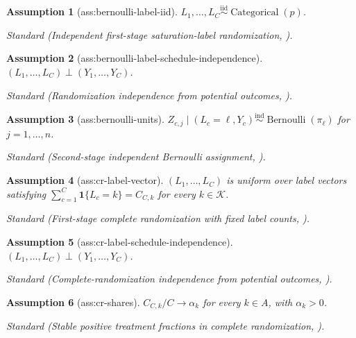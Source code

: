 \documentclass{article}
\newtheorem{assumption}{Assumption}
\begin{document}
\begin{assumption}[ass:bernoulli-label-iid]\label{ass:bernoulli-label-iid}
\(L_1,\ldots,L_C\stackrel{\mathrm{iid}}{\sim}\operatorname{Categorical}(p)\).
\par\smallskip\noindent\emph{Standard} (Independent first-stage saturation-label randomization, \cite{HanOwusuShin2026}).
\end{assumption}

\begin{assumption}[ass:bernoulli-label-schedule-independence]\label{ass:bernoulli-label-schedule-independence}
\((L_1,\ldots,L_C)\perp(Y_1,\ldots,Y_C)\).
\par\smallskip\noindent\emph{Standard} (Randomization independence from potential outcomes, \cite{HanOwusuShin2026}).
\end{assumption}

\begin{assumption}[ass:bernoulli-units]\label{ass:bernoulli-units}
\(Z_{c,j}\mid(L_c=\ell,Y_c)\stackrel{\mathrm{ind}}{\sim}\operatorname{Bernoulli}(\pi_\ell)\) for \(j=1,\ldots,n\).
\par\smallskip\noindent\emph{Standard} (Second-stage independent Bernoulli assignment, \cite{HanOwusuShin2026}).
\end{assumption}

\begin{assumption}[ass:cr-label-vector]\label{ass:cr-label-vector}
\((L_1,\ldots,L_C)\) is uniform over label vectors satisfying \(\sum_{c=1}^C\mathbf 1\{L_c=k\}=C_{C,k}\) for every \(k\in\mathcal K\).
\par\smallskip\noindent\emph{Standard} (First-stage complete randomization with fixed label counts, \cite{BasseFeller2018}).
\end{assumption}

\begin{assumption}[ass:cr-label-schedule-independence]\label{ass:cr-label-schedule-independence}
\((L_1,\ldots,L_C)\perp(Y_1,\ldots,Y_C)\).
\par\smallskip\noindent\emph{Standard} (Complete-randomization independence from potential outcomes, \cite{BasseFeller2018}).
\end{assumption}

\begin{assumption}[ass:cr-shares]\label{ass:cr-shares}
\(C_{C,k}/C\to\alpha_k\) for every \(k\in A\), with \(\alpha_k>0\).
\par\smallskip\noindent\emph{Standard} (Stable positive treatment fractions in complete randomization, \cite{BasseFeller2018}).
\end{assumption}
\end{document}
